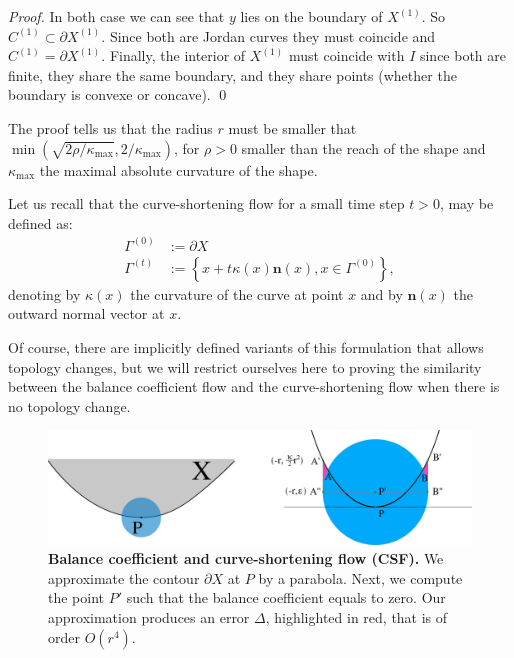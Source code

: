 \documentclass[review]{siamart220329}
\begin{document}
\begin{proof}
  In both case we can see that $y$ lies on the boundary of
  $X^{(1)}$. So $C^{(1)} \subset \partial X^{(1)}$. Since both
  are Jordan curves they must coincide and $C^{(1)} = \partial
  X^{(1)}$.  Finally, the interior of $X^{(1)}$ must coincide with
  $I$ since both are finite, they share the same boundary, and they
  share points (whether the boundary is convexe or concave).
  \qed
\end{proof}

The proof tells us that the radius $r$ must be smaller that
$\min(\sqrt{2\rho / \kappa_{\max}},2 / \kappa_{\max})$, for $\rho>0$
smaller than the reach of the shape and $\kappa_{\max}$ the maximal
absolute curvature of the shape.

Let us recall that the curve-shortening flow for a small time step
$t>0$, may be defined as:
\begin{align}
  \Gamma^{(0)} & := \partial X \nonumber \\
  \Gamma^{(t)} & := \left\{ x + t\kappa(x)\mathbf{n}(x), x \in \Gamma^{(0)} \right\}, \label{eq-csf}
\end{align}
denoting by $\kappa(x)$ the curvature of the curve at point $x$
and by $\mathbf{n}(x)$ the outward normal vector at $x$.

Of course, there are implicitly defined variants of this formulation
that allows topology changes, but we will restrict ourselves here to
proving the similarity between the balance coefficient flow and the
curve-shortening flow when there is no topology change.


%
\begin{figure}
\center
\includegraphics[scale=0.75]{figures/analysis-error/geometry-argument.png}
\caption{\textbf{Balance coefficient and curve-shortening flow (CSF).} We approximate the contour $\partial X$ at $P$ by a parabola. Next, we compute the point $P'$ such that the balance coefficient equals to zero. Our approximation produces an error $\Delta$, highlighted in red, that is of order $O(r^4)$. \label{fig:geometric-argument}}
\end{figure}
%
\end{document}
